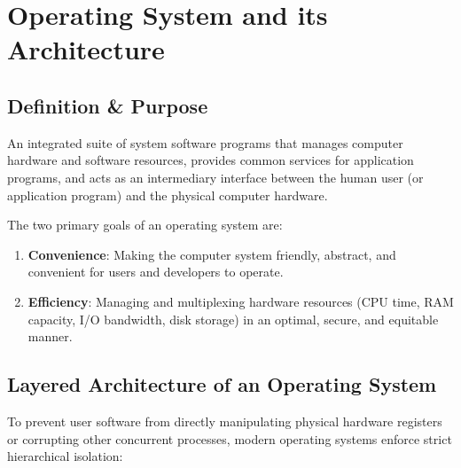 \section{Operating System and its Architecture}

\subsection{Definition \& Purpose}

\begin{definition}
An integrated suite of system software programs that manages computer hardware and software resources, provides common services for application programs, and acts as an intermediary interface between the human user (or application program) and the physical computer hardware.
\end{definition}

The two primary goals of an operating system are:
\begin{enumerate}[leftmargin=1.5em]
    \item \textbf{Convenience}: Making the computer system friendly, abstract, and convenient for users and developers to operate.
    \item \textbf{Efficiency}: Managing and multiplexing hardware resources (CPU time, RAM capacity, I/O bandwidth, disk storage) in an optimal, secure, and equitable manner.
\end{enumerate}

\subsection{Layered Architecture of an Operating System}

To prevent user software from directly manipulating physical hardware registers or corrupting other concurrent processes, modern operating systems enforce strict hierarchical isolation:

